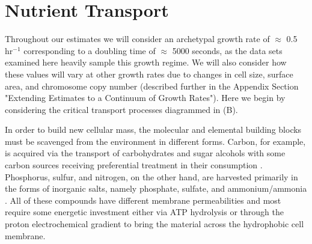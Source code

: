 %
%

\section{Nutrient Transport}
Throughout our estimates we will consider an archetypal growth rate of $\approx$
0.5 hr$^{-1}$ corresponding to a doubling time of $\approx$ 5000 seconds, as the
data sets examined here heavily sample this growth regime. We will also consider
how these values will vary at other growth rates due to changes in cell size,
surface area, and chromosome copy number \citep{taheriaraghi2015, harris2018}
(described further in the Appendix Section "Extending Estimates to a Continuum
of Growth Rates"). Here we begin by considering the critical transport processes
diagrammed in (B).

In order to build new cellular mass, the molecular and
elemental building blocks must be scavenged from the environment in different
forms. Carbon, for example, is acquired via the transport of carbohydrates
and sugar alcohols with some carbon sources receiving preferential treatment
in their consumption \citep{monod1947}. Phosphorus, sulfur, and nitrogen, on
the other hand, are harvested primarily in the forms of inorganic salts,
namely phosphate, sulfate, and ammonium/ammonia \citep{jun2018,
assentoft2016, stasi2019, antonenko1997, rosenberg1977, willsky1973}. All of
these compounds have different membrane permeabilities \citep{phillips2018}
and most require some energetic investment either via ATP hydrolysis or
through the proton electrochemical gradient to bring the material across the
hydrophobic cell membrane.

